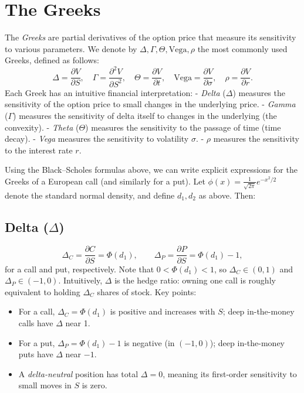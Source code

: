 \section{The Greeks}
The \emph{Greeks} are partial derivatives of the option price that measure its sensitivity to various parameters.  We denote by \(\Delta, \Gamma, \Theta, \mathrm{Vega}, \rho\) the most commonly used Greeks, defined as follows:
\[
\Delta = \frac{\partial V}{\partial S}, 
\quad
\Gamma = \frac{\partial^2 V}{\partial S^2},
\quad
\Theta = \frac{\partial V}{\partial t}, 
\quad
\mathrm{Vega} = \frac{\partial V}{\partial \sigma}, 
\quad
\rho = \frac{\partial V}{\partial r}.
\]
Each Greek has an intuitive financial interpretation:
- \emph{Delta} (\(\Delta\)) measures the sensitivity of the option price to small changes in the underlying price.
- \emph{Gamma} (\(\Gamma\)) measures the sensitivity of delta itself to changes in the underlying (the convexity).
- \emph{Theta} (\(\Theta\)) measures the sensitivity to the passage of time (time decay).
- \emph{Vega} measures the sensitivity to volatility \(\sigma\).
- \(\rho\) measures the sensitivity to the interest rate \(r\). 

Using the Black--Scholes formulas above, we can write explicit expressions for the Greeks of a European call (and similarly for a put).  Let \(\phi(x)=\frac{1}{\sqrt{2\pi}}e^{-x^2/2}\) denote the standard normal density, and define \(d_1,d_2\) as above.  Then:

\subsection{Delta (\(\Delta\))}
\[
\Delta_C = \frac{\partial C}{\partial S} = \Phi(d_1), 
\qquad
\Delta_P = \frac{\partial P}{\partial S} = \Phi(d_1) - 1,
\]
for a call and put, respectively.  Note that \(0<\Phi(d_1)<1\), so \(\Delta_C\in(0,1)\) and \(\Delta_P\in(-1,0)\).  Intuitively, \(\Delta\) is the hedge ratio: owning one call is roughly equivalent to holding \(\Delta_C\) shares of stock.  Key points:
\begin{itemize}
    \item For a call, \(\Delta_C = \Phi(d_1)\) is positive and increases with \(S\); deep in-the-money calls have \(\Delta\) near 1.
    \item For a put, \(\Delta_P = \Phi(d_1)-1\) is negative (in \((-1,0)\)); deep in-the-money puts have \(\Delta\) near \(-1\).
    \item A \emph{delta-neutral} position has total \(\Delta = 0\), meaning its first-order sensitivity to small moves in \(S\) is zero.
\end{itemize}

